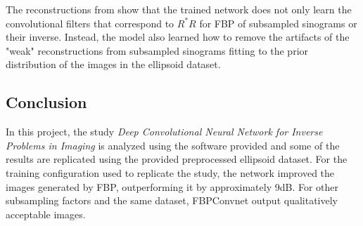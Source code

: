 \documentclass[journal, onecolumn, 11pt]{IEEEtran}
\begin{document}
The reconstructions from  show that the trained network does not only learn the convolutional filters that correspond to $R^\ast R$ for FBP of subsampled sinograms or their inverse. Instead, the model also learned how to remove the artifacts of the "weak" reconstructions from subsampled sinograms fitting to the prior distribution of the images in the ellipsoid dataset. 

\subsection{Conclusion}

In this project, the study \textit{Deep Convolutional Neural Network for Inverse Problems in Imaging} is analyzed using the software provided and some of the results are replicated using the provided preprocessed ellipsoid dataset. For the training configuration used to replicate the study, the network improved the images generated by FBP, outperforming it by approximately 9dB. For other subsampling factors and the same dataset, FBPConvnet output qualitatively acceptable images. 
\clearpage
\printbibliography
\end{document}
